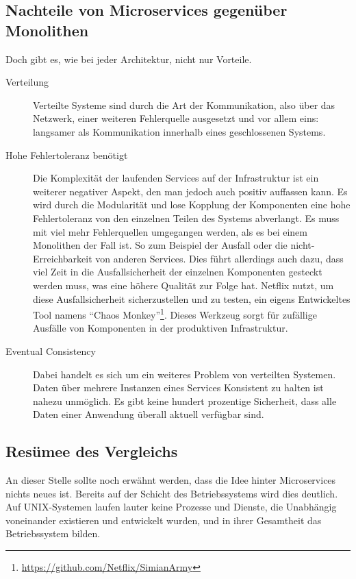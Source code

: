 \documentclass[12pt,a4paper,bibliography=totocnumbered,listof=totocnumbered]{scrartcl}
\begin{document}
\subsection{Nachteile von Microservices gegenüber Monolithen}\label{ch:ms-mon-cons}

Doch gibt es, wie bei jeder Architektur, nicht nur Vorteile.

\begin{description}
	\item[Verteilung] Verteilte Systeme sind durch die Art der Kommunikation, also über das Netzwerk, einer weiteren Fehlerquelle ausgesetzt und vor allem eins: langsamer als Kommunikation innerhalb eines geschlossenen Systems\cite{tradeoffs}. 
	
	\item[Hohe Fehlertoleranz benötigt\label{high-tolerance}] Die Komplexität der laufenden Services auf der Infrastruktur ist ein weiterer negativer Aspekt, den man jedoch auch positiv auffassen kann. Es wird durch die Modularität und lose Kopplung der Komponenten eine hohe Fehlertoleranz von den einzelnen Teilen des Systems abverlangt. Es muss mit viel mehr Fehlerquellen umgegangen werden, als es bei einem Monolithen der Fall ist. So zum Beispiel der Ausfall oder die nicht-Erreichbarkeit von anderen Services. Dies führt allerdings auch dazu, dass viel Zeit in die Ausfallsicherheit der einzelnen Komponenten gesteckt werden muss, was eine höhere Qualität zur Folge hat. Netflix nutzt, um diese Ausfallsicherheit sicherzustellen und zu testen, ein eigens Entwickeltes Tool namens \enquote{Chaos Monkey}\footnote{\url{https://github.com/Netflix/SimianArmy}}. Dieses Werkzeug sorgt für zufällige Ausfälle von Komponenten in der produktiven Infrastruktur.
	
	\item[Eventual Consistency] Dabei handelt es sich um ein weiteres Problem von verteilten Systemen. Daten über mehrere Instanzen eines Services Konsistent zu halten ist nahezu unmöglich. Es gibt keine hundert prozentige Sicherheit, dass alle Daten einer Anwendung überall aktuell verfügbar sind.
\end{description}

\subsection{Resümee des Vergleichs}

An dieser Stelle sollte noch erwähnt werden, dass die Idee hinter Microservices nichts neues ist. Bereits auf der Schicht des Betriebssystems wird dies deutlich. Auf UNIX-Systemen laufen lauter keine Prozesse und Dienste, die Unabhängig voneinander existieren und entwickelt wurden, und in ihrer Gesamtheit das Betriebssystem bilden.\cite{hoff}
\end{document}

